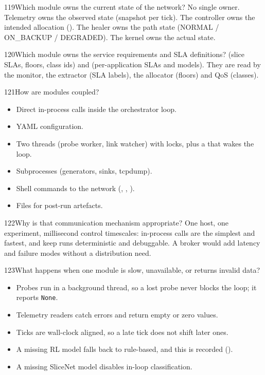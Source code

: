 \begin{qa}{119}{Which module owns the current state of the network?}
No single owner. Telemetry owns the observed state (snapshot per tick). The controller owns the intended allocation
(). The healer owns the path state (\textsf{NORMAL} / \textsf{ON\_BACKUP} /
\textsf{DEGRADED}). The kernel owns the actual state.
\end{qa}

\begin{qa}{120}{Which module owns the service requirements and SLA definitions?}
 (slice SLAs, floors, class ids) and  (per-application
SLAs and models). They are read by the monitor, the extractor (SLA labels), the allocator (floors) and QoS (classes).
\end{qa}

\begin{qa}{121}{How are modules coupled?}
\begin{itemize}
\item Direct in-process calls inside the orchestrator loop.
\item YAML configuration.
\item Two threads (probe worker, link watcher) with locks, plus a  that wakes the loop.
\item Subprocesses (generators, sinks, tcpdump).
\item Shell commands to the network (, , ).
\item Files for post-run artefacts.
\end{itemize}
\end{qa}

\begin{qa}{122}{Why is that communication mechanism appropriate?}
One host, one experiment, millisecond control timescales: in-process calls are the simplest and fastest, and keep
runs deterministic and debuggable. A broker would add latency and failure modes without a distribution need.
\end{qa}

\begin{qa}{123}{What happens when one module is slow, unavailable, or returns invalid data?}
\begin{itemize}
\item Probes run in a background thread, so a lost probe never blocks the loop; it reports \texttt{None}.
\item Telemetry readers catch errors and return empty or zero values.
\item Ticks are wall-clock aligned, so a late tick does not shift later ones.
\item A missing RL model falls back to rule-based, and this is recorded ().
\item A missing SliceNet model disables in-loop classification.
\end{itemize}
\end{qa}

